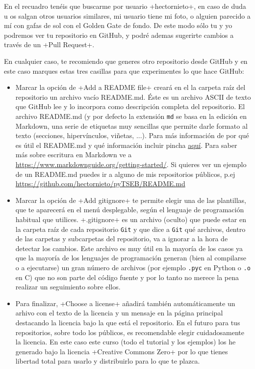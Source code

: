 \documentclass[a5paper, oneside,10pt]{article}
\begin{document}
\begin{enumerate}
       En el recuadro tenéis que buscarme por usuario \cverb+hectornieto+, en caso de duda u os salgan otros usuarios similares, mi usuario tiene mi foto, o alguien parecido a mí con gafas de sol con el Golden Gate de fondo. De este modo sólo tu y yo podremos ver tu repositorio en GitHub, y podré ademas sugerirte cambios a través de un \cverb+Pull Request+.
      \end{enumerate}
       
       En cualquier caso, te recomiendo que generes otro repositorio desde GitHub y en este caso marques estas tres casillas para que experimentes lo que hace GitHub:
       
       \begin{itemize}
        \item Marcar la opción de \cverb+Add a README file+ creará en el la carpeta raíz del repositorio un archivo vacío README.md. Éste es un archivo ASCII de texto que GitHub lee y lo incorpora como descripción completa del repositorio. El archivo README.md (y por defecto la extensión \verb+md+ se basa en la edición en Markdown, una serie de etiquetas muy sencillas que permite darle formato al texto (secciones, hipervínculos, viñetas, ...). Para más información de por qué es útil el README.md y qué información incluir pincha \href{https://github.com/18F/open-source-guide/blob/18f-pages/pages/making-readmes-readable.md}{aquí}. Para saber más sobre escritura en Markdown ve a \url{https://www.markdownguide.org/getting-started/}. Si quieres ver un ejemplo de un README.md puedes ir a alguno de mis repositorios públicos, p.ej \url{https://github.com/hectornieto/pyTSEB/README.md}
       
        \item Marcar la opción de \cverb+Add gitignore+ te permite elegir una de las plantillas, que te aparecerá en el menú desplegable, según el lenguaje de programación habitual que utilices. \cverb+.gitignore+ es un archivo (oculto) que puede estar en la carpeta raíz de cada repositorio \verb+Git+ y que dice a \verb+Git+ qué archivos, dentro de las carpetas y subcarpetas del repositorio, va a ignorar a la hora de detectar los cambios. Este archivo es muy útil en la mayoría de los casos ya que la mayoría de los lenguajes de programación generan (bien al compilarse o a ejecutarse) un gran número de archivos (por ejemplo \verb+.pyc+ en Python o \verb+.o+ en C) que no son parte del código fuente y por lo tanto no merece la pena realizar un seguimiento sobre ellos.
       
        \item Para finalizar, \cverb+Choose a license+  añadirá   también automáticamente un arhivo con el texto de la licencia y un mensaje en la página principal destacando la licencia bajo la que está el repositorio. En el futuro para tus repositorios, sobre todo los públicos, es recomendable elegir cuidadosamente la licencia. En este caso este curso (todo el tutorial y los ejemplos) los he generado bajo la licencia \cverb+Creative Commons Zero+ por lo que tienes libertad total para usarlo y distribuirlo para lo que te plazca.
       

\end{itemize}
\end{document}

